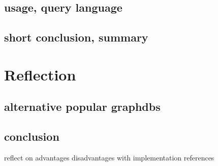 \subsection{usage, query language}
\subsection{short conclusion, summary}

\section{Reflection}
\subsection{alternative popular graphdbs}
\subsection{conclusion}
reflect on advantages disadvantages with implementation references

